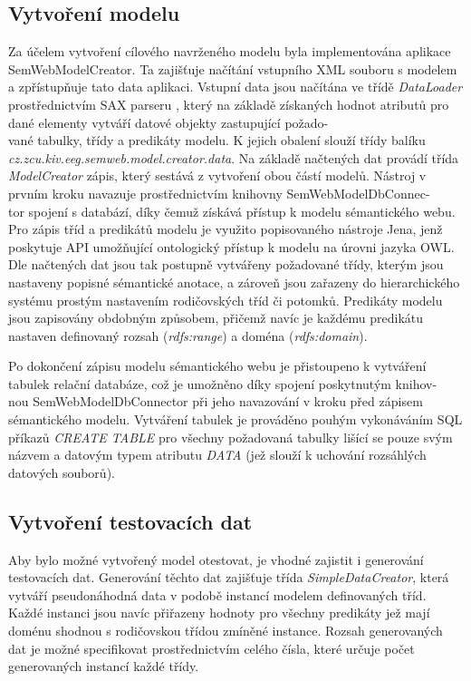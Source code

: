 \documentclass{projekt}
\begin{document}
\subsection{Vytvoření modelu}
\hspace{0.65cm}Za účelem vytvoření cílového navrženého modelu byla implementována aplikace SemWebModelCreator. Ta zajišťuje načítání vstupního XML souboru s modelem a zpřístupňuje tato data aplikaci. Vstupní data jsou načítána ve třídě {\it DataLoader} prostřednictvím SAX parseru \cite{_16}, který na základě získaných hodnot atributů pro dané elementy vytváří datové objekty zastupující požado-\\vané tabulky, třídy a predikáty modelu. K jejich obalení slouží třídy balíku {\it cz.zcu.kiv.eeg.semweb.model.creator.data}. Na základě načtených dat provádí třída {\it ModelCreator} zápis, který sestává z vytvoření obou částí modelů. Nástroj v prvním kroku navazuje prostřednictvím knihovny SemWebModelDbConnec-\\tor spojení s databází, díky čemuž získává přístup k modelu sémantického webu. Pro zápis tříd a predikátů modelu je využito popisovaného nástroje Jena, jenž poskytuje API umožňující ontologický přístup k modelu na úrovni jazyka OWL. Dle načtených dat jsou tak postupně vytvářeny požadované třídy, kterým jsou nastaveny popisné sémantické anotace, a zároveň jsou zařazeny do hierarchického systému prostým nastavením rodičovských tříd či potomků. Predikáty modelu jsou zapisovány obdobným způsobem, přičemž navíc je každému predikátu nastaven definovaný rozsah ({\it rdfs:range}) a doména ({\it rdfs:domain}).

Po dokončení zápisu modelu sémantického webu je přistoupeno k vytváření tabulek relační databáze, což je umožněno díky spojení poskytnutým knihov-\\nou SemWebModelDbConnector při jeho navazování v kroku před zápisem sémantického modelu. Vytváření tabulek je prováděno pouhým vykonáváním SQL příkazů {\it CREATE TABLE} pro všechny požadovaná tabulky lišící se pouze svým názvem a datovým typem atributu {\it DATA} (jež slouží k uchování rozsáhlých datových souborů). 

\subsection{Vytvoření testovacích dat}
\hspace{0.65cm}Aby bylo možné vytvořený model otestovat, je vhodné zajistit i generování testovacích dat. Generování těchto dat zajišťuje třída {\it SimpleDataCreator}, která vytváří pseudonáhodná data v podobě instancí modelem definovaných tříd. Každé instanci jsou navíc přiřazeny hodnoty pro všechny predikáty jež mají doménu shodnou s rodičovskou třídou zmíněné instance. Rozsah generovaných dat je možné specifikovat prostřednictvím celého čísla, které určuje počet generovaných instancí každé třídy.
\end{document}
